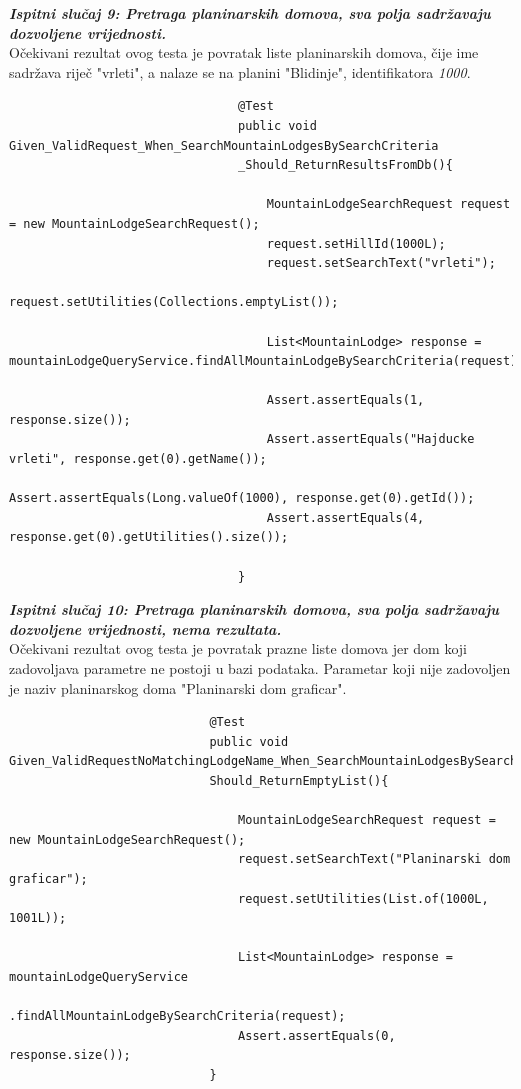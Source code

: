 				\textbf{\textit{Ispitni slučaj 9: Pretraga planinarskih domova, sva polja sadržavaju dozvoljene vrijednosti.}}\\
				Očekivani rezultat ovog testa je povratak liste planinarskih domova, čije ime sadržava riječ "vrleti", a nalaze se na planini "Blidinje", identifikatora \textit{1000}.\\
				
							
							\begin{lstlisting}
								@Test
								public void Given_ValidRequest_When_SearchMountainLodgesBySearchCriteria
								_Should_ReturnResultsFromDb(){
									
									MountainLodgeSearchRequest request = new MountainLodgeSearchRequest();
									request.setHillId(1000L);
									request.setSearchText("vrleti");
									request.setUtilities(Collections.emptyList());
									
									List<MountainLodge> response = mountainLodgeQueryService.findAllMountainLodgeBySearchCriteria(request);
									
									Assert.assertEquals(1, response.size());
									Assert.assertEquals("Hajducke vrleti", response.get(0).getName());
									Assert.assertEquals(Long.valueOf(1000), response.get(0).getId());
									Assert.assertEquals(4, response.get(0).getUtilities().size());
									
								}
							\end{lstlisting}
						
						\textbf{\textit{Ispitni slučaj 10: Pretraga planinarskih domova, sva polja sadržavaju dozvoljene vrijednosti, nema rezultata.}}\\
						Očekivani rezultat ovog testa je povratak prazne liste domova jer dom koji zadovoljava parametre ne postoji u bazi podataka. Parametar koji nije zadovoljen je naziv planinarskog doma "Planinarski dom graficar".\\
						
						\begin{lstlisting}
							@Test
							public void Given_ValidRequestNoMatchingLodgeName_When_SearchMountainLodgesBySearchCriteria_
							Should_ReturnEmptyList(){
								
								MountainLodgeSearchRequest request = new MountainLodgeSearchRequest();
								request.setSearchText("Planinarski dom graficar");
								request.setUtilities(List.of(1000L, 1001L));
								
								List<MountainLodge> response = mountainLodgeQueryService
								.findAllMountainLodgeBySearchCriteria(request);
								Assert.assertEquals(0, response.size());
							}
						\end{lstlisting}
					
